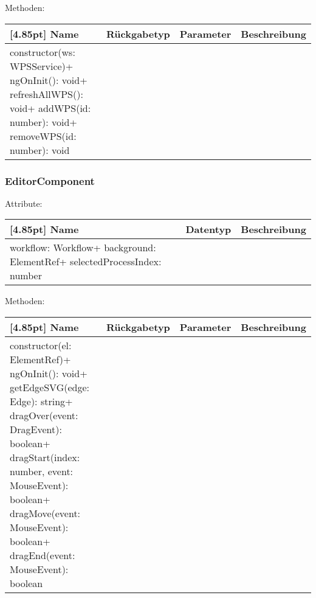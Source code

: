                 Methoden:
        		\begin{center}
                \setlength\tabcolsep{5pt}
                	\renewcommand{\arraystretch}{1.5}
                    	\begin{tabularx}{\textwidth}{|l|l|l|X|}
                    	\hline
                    	\rowcolor[gray]{0.75}[4.85pt]
                		Name & Rückgabetyp & Parameter & Beschreibung \\ \hline 
                		constructor(ws: WPSService)+ ngOnInit(): void+ refreshAllWPS(): void+ addWPS(id: number): void+ removeWPS(id: number): void
                        & & &  \\ \hline
                        \end{tabularx}
        		\end{center}
        	
        	\subsubsection{EditorComponent}
        	
        	    Attribute:
                \begin{center}
                	\renewcommand{\arraystretch}{1.5}
                    \setlength\tabcolsep{5pt}
                	\begin{tabularx}{\textwidth}{|l|l|X|}
                		\hline
                        \rowcolor[gray]{0.75}[4.85pt]            		
                        Name & Datentyp & Beschreibung \\ \hline
                        workflow: Workflow+ background: ElementRef+ selectedProcessIndex: number
                        & &  \\ \hline
                	\end{tabularx}
                \end{center}
                
                Methoden:
        		\begin{center}
                \setlength\tabcolsep{5pt}
                	\renewcommand{\arraystretch}{1.5}
                    	\begin{tabularx}{\textwidth}{|l|l|l|X|}
                    	\hline
                    	\rowcolor[gray]{0.75}[4.85pt]
                		Name & Rückgabetyp & Parameter & Beschreibung \\ \hline
                		constructor(el: ElementRef)+ ngOnInit(): void+ getEdgeSVG(edge: Edge): string+ dragOver(event: DragEvent): boolean+ dragStart(index: number, event: MouseEvent): boolean+ dragMove(event: MouseEvent): boolean+ dragEnd(event: MouseEvent): boolean
                        & & &  \\ \hline
                        \end{tabularx}
        		\end{center}
        	
